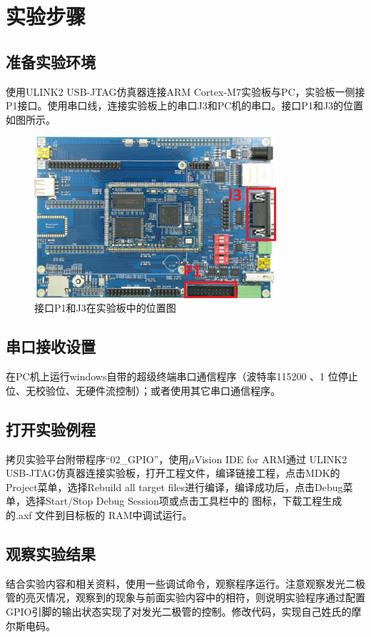 ﻿\documentclass[UTF8,12pt]{article}
\begin{document}
\section{实验步骤}
\subsection{准备实验环境}
使用ULINK2 USB-JTAG仿真器连接ARM Cortex-M7实验板与PC，实验板一侧接P1接口。使用串口线，连接实验板上的串口J3和PC机的串口。接口P1和J3的位置如图所示。

\begin{figure}[htbp]
    \centering
    \includegraphics[width=0.8\textwidth]{imgs/2.png}
    \caption{接口P1和J3在实验板中的位置图}
\end{figure}

\subsection{串口接收设置}
在PC机上运行windows自带的超级终端串口通信程序（波特率115200 、1 位停止位、无校验位、无硬件流控制）；或者使用其它串口通信程序。 

\subsection{打开实验例程}
拷贝实验平台附带程序“02\_GPIO”，使用$\mu$Vision IDE for ARM通过 ULINK2 USB-JTAG仿真器连接实验板，打开工程文件，编译链接工程，点击MDK的Project菜单，选择Rebuild all target files进行编译，编译成功后，点击Debug菜单，选择Start/Stop Debug Session项或点击工具栏中的 图标，下载工程生成的.axf 文件到目标板的 RAM中调试运行。

\subsection{观察实验结果}
结合实验内容和相关资料，使用一些调试命令，观察程序运行。注意观察发光二极管的亮灭情况，观察到的现象与前面实验内容中的相符，则说明实验程序通过配置GPIO引脚的输出状态实现了对发光二极管的控制。修改代码，实现自己姓氏的摩尔斯电码。
\end{document}
